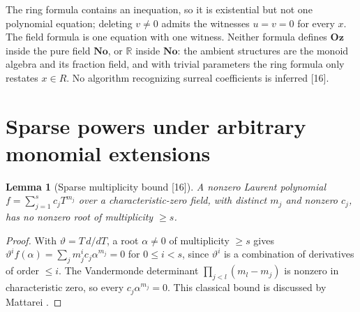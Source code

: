 \documentclass[11pt,oneside]{article}
\numberwithin{equation}{section}
\newtheorem{lemma}[lemma]{Lemma}
\theoremstyle{definition}
\theoremstyle{remark}
\newcommand{\No}{\mathbf{No}}
\newcommand{\Oz}{\mathbf{Oz}}
\newcommand{\R}{\mathbb R}
\newcommand{\src}[1]{\textup{\textsf{\small[#1]}}}
\begin{document}
The ring formula contains an inequation, so it is existential but not one polynomial equation; deleting
$v\ne0$ admits the witnesses $u=v=0$ for every $x$. The field formula is one equation with one witness.
Neither formula defines $\Oz$ inside the pure field $\No$, or $\R$ inside $\No$: the ambient structures are the
monoid algebra and its fraction field, and with trivial parameters the ring formula only restates $x\in R$. No
algorithm recognizing surreal coefficients is inferred \src{16}.

\section{Sparse powers under arbitrary monomial extensions}\label{opa:cr:sec:sparse}

\begin{lemma}[Sparse multiplicity bound \src{16}]\label{opa:cr:lem:multiplicity}
A nonzero Laurent polynomial $f=\sum_{j=1}^sc_jT^{m_j}$ over a characteristic-zero field, with distinct $m_j$ and
nonzero $c_j$, has no nonzero root of multiplicity $\ge s$.
\end{lemma}
\begin{proof}
With $\vartheta=T\,d/dT$, a root $\alpha\ne0$ of multiplicity $\ge s$ gives $\vartheta^if(\alpha)=\sum_jm_j^ic_j\alpha^{m_j}=0$ for
$0\le i<s$, since $\vartheta^i$ is a combination of derivatives of order $\le i$. The Vandermonde determinant
$\prod_{j<l}(m_l-m_j)$ is nonzero in characteristic zero, so every $c_j\alpha^{m_j}=0$. This classical bound is
discussed by Mattarei \cite{Mattarei}.
\end{proof}
\end{document}
